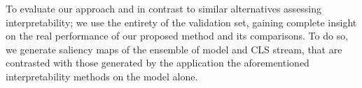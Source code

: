 To evaluate our approach and in contrast to similar alternatives assessing interpretability; we use the entirety of the validation set, gaining complete insight on the real performance of our proposed method and its comparisons. To do so, we generate saliency maps of the ensemble of model and CLS stream, that are contrasted with those generated by the application the aforementioned interpretability methods on the model alone.\\  %
